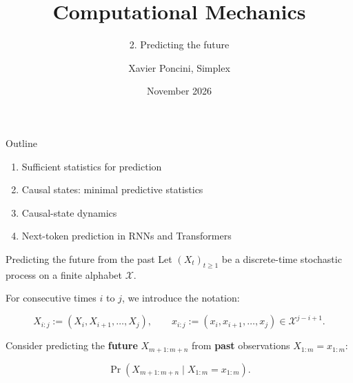 \documentclass[aspectratio=169,12pt,t]{beamer}
\title{Computational Mechanics}
\subtitle{2. Predicting the future}
\institute{ILIAD Intensive}
\date{November 2026}
\author{Xavier Poncini, Simplex}
\begin{document}
\iliadtitle

\begin{frame}{Outline}
  \vspace{5mm}
  \begin{enumerate}
    \setlength{\itemsep}{4mm}
    \item Sufficient statistics for prediction
    \item Causal states: minimal predictive statistics
    \item Causal-state dynamics
    \item Next-token prediction in RNNs and Transformers
  \end{enumerate}
\end{frame}

\begin{frame}{Predicting the future from the past}
  Let $(X_t)_{t\geq 1}$ be a discrete-time stochastic process on a finite alphabet $\mathcal{X}$.

  \vspace{2mm}

  For consecutive times $i$ to $j$, we introduce the notation:

  \[
    X_{i:j}:=(X_i,X_{i+1},\ldots,X_j),
    \qquad
    x_{i:j}:=(x_i,x_{i+1},\ldots,x_j)\in\mathcal{X}^{j-i+1}.
  \]

  Consider predicting the \textbf{future} $X_{m+1:m+n}$
  from \textbf{past} observations $X_{1:m}=x_{1:m}$:

  \[
    \Pr\!\left(X_{m+1:m+n}\mid X_{1:m}=x_{1:m}\right).
  \]

  {\centering
    \setlength{\fboxsep}{3mm}
    \setlength{\fboxrule}{0.5pt}
    \par}
\end{frame}
\end{document}
